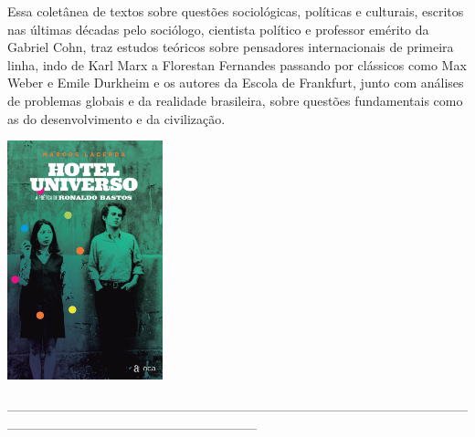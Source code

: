 \medskip

\noindent{}Essa coletânea de textos sobre questões sociológicas, políticas e culturais, escritos nas últimas décadas pelo sociólogo, cientista político e professor emérito da  Gabriel Cohn, traz estudos teóricos sobre pensadores internacionais de primeira linha, indo de Karl Marx a Florestan Fernandes passando por clássicos como Max Weber e Emile Durkheim e os autores da Escola de Frankfurt, junto com análises de problemas globais e da realidade brasileira, sobre questões fundamentais como as do desenvolvimento e da civilização.

\vfill

\hspace*{-.4cm}\begin{minipage}[c]{0.90\linewidth}
\small{
{}}
\end{minipage}

\pagebreak

\hspace{.5cm}

\begin{center}
\hspace*{-.5cm}\includegraphics[width=45mm]{./imgs/universo.jpg}
\end{center}

\hspace*{-2cm}\_\_\_\_\_\_\_\_\_\_\_\_\_\_\_\_\_\_\_\_\_\_\_\_\_\_\_\_\_\_\_\_\_\_\_\_\_\_\_\_\_\_\_\_\_\_\_\_\_\_\_\_\_\_\_\_\_\_\_\_\_\_\_\_\_\_\_\_\_\_\_\_\_\_

